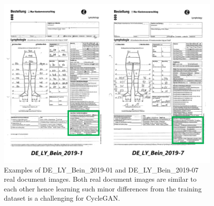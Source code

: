 \vspace*{1.5cm}
\begin{figure}[H]
    \begin{center}
	\includegraphics[scale=0.50]{images/Evaluation/MissclassificationExample.png}
	\caption[Examples of DE\_LY\_Bein\_2019-01 and DE\_LY\_Bein\_2019-07 real document images.]{Examples of DE\_LY\_Bein\_2019-01 and DE\_LY\_Bein\_2019-07 real document images. Both real document images are similar to each other hence learning such minor differences from the training dataset is a challenging for \ac{CycleGAN}.}
	\label{fig:MissclassificationExample}
	\end{center}
\end{figure}



